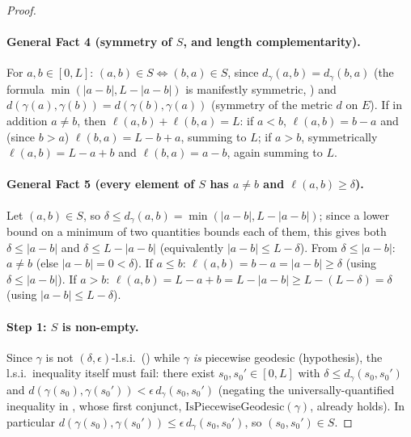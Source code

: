 \begin{proof}
  \paragraph{General Fact 4 (symmetry of $S$, and length complementarity).} For $a,b\in[0,L]$:
  $(a,b)\in S \iff (b,a)\in S$, since $d_\gamma(a,b)=d_\gamma(b,a)$ (the formula
  $\min(|a-b|,L-|a-b|)$ is manifestly symmetric, ) and $d(\gamma(a),\gamma(b)) =
  d(\gamma(b),\gamma(a))$ (symmetry of the metric $d$ on $E$). If in addition $a \ne b$, then
  $\ell(a,b)+\ell(b,a) = L$: if $a<b$, $\ell(a,b)=b-a$ and (since $b>a$) $\ell(b,a) = L-b+a$, summing
  to $L$; if $a>b$, symmetrically $\ell(a,b)=L-a+b$ and $\ell(b,a)=a-b$, again summing to $L$.

  \paragraph{General Fact 5 (every element of $S$ has $a\ne b$ and $\ell(a,b)\ge\delta$).} Let
  $(a,b)\in S$, so $\delta \le d_\gamma(a,b) = \min(|a-b|,L-|a-b|)$; since a lower bound on a minimum
  of two quantities bounds each of them, this gives both $\delta \le |a-b|$ and $\delta \le
  L-|a-b|$ (equivalently $|a-b|\le L-\delta$). From $\delta\le|a-b|$: $a\ne b$ (else $|a-b|=0<
  \delta$). If $a\le b$: $\ell(a,b)=b-a=|a-b|\ge\delta$ (using $\delta\le|a-b|$). If $a>b$:
  $\ell(a,b)=L-a+b=L-|a-b|\ge L-(L-\delta)=\delta$ (using $|a-b|\le L-\delta$).

  \paragraph{Step 1: $S$ is non-empty.} Since $\gamma$ is not $(\delta,\epsilon)$-l.s.i.\
  () while $\gamma$ \emph{is} piecewise geodesic (hypothesis), the l.s.i.\ inequality
  itself must fail: there exist $s_0,s_0'\in[0,L]$ with $\delta \le d_\gamma(s_0,s_0')$ and
  $d(\gamma(s_0),\gamma(s_0')) < \epsilon\, d_\gamma(s_0,s_0')$ (negating the universally-quantified
  inequality in \noderef{IsLSI}, whose first conjunct, $\mathrm{IsPiecewiseGeodesic}(\gamma)$,
  already holds). In particular $d(\gamma(s_0),\gamma(s_0')) \le \epsilon\, d_\gamma(s_0,s_0')$, so
  $(s_0,s_0') \in S$.


\end{proof}
